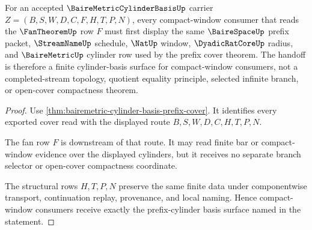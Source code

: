 \begin{theorem}
\label{thm:bairemetric-cylinder-basis-compact-window-handoff}
For an accepted $\BaireMetricCylinderBasisUp$ carrier $Z=(B,S,W,D,C,F,H,T,P,N)$, every compact-window consumer that reads the $\FanTheoremUp$ row $F$ must first display the same $\BaireSpaceUp$ prefix packet, $\StreamNameUp$ schedule, $\NatUp$ window, $\DyadicRatCoreUp$ radius, and $\BaireMetricUp$ cylinder row used by the prefix cover theorem. The handoff is therefore a finite cylinder-basis surface for compact-window consumers, not a completed-stream topology, quotient equality principle, selected infinite branch, or open-cover compactness theorem.
\end{theorem}
\begin{proof}
Use \autoref{thm:bairemetric-cylinder-basis-prefix-cover}. It identifies every exported cover read with the displayed route $B,S,W,D,C,H,T,P,N$.

The fan row $F$ is downstream of that route. It may read finite bar or compact-window evidence over the displayed cylinders, but it receives no separate branch selector or open-cover compactness coordinate.

The structural rows $H,T,P,N$ preserve the same finite data under componentwise transport, continuation replay, provenance, and local naming. Hence compact-window consumers receive exactly the prefix-cylinder basis surface named in the statement.
\end{proof}




